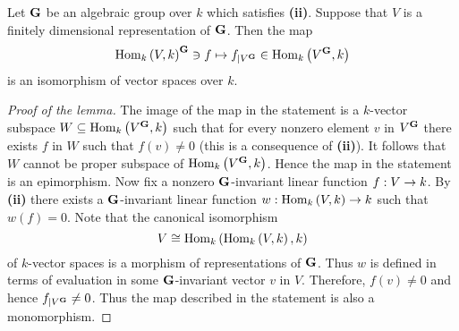 \begin{lemma}\label{lemma:every_functional_comes_from_an_invariant_form}
Let $\mathbf{G}$ be an algebraic group over $k$ which satisfies \textbf{(ii)}. Suppose that $V$ is a finitely dimensional representation of $\mathbf{G}$. Then the map
$$\mathrm{Hom}_{k}\left(V,k\right)^{\mathbf{G}}\ni f \mapsto f_{\mid V^{\mathbf{G}}}\in \mathrm{Hom}_k\left(V^{\mathbf{G}}, k\right)$$
is an isomorphism of vector spaces over $k$.
\end{lemma}
\begin{proof}[Proof of the lemma]
The image of the map in the statement is a $k$-vector subspace $W\subseteq \mathrm{Hom}_k\left(V^{\mathbf{G}}, k\right)$ such that for every nonzero element $v$ in $V^{\mathbf{G}}$ there exists $f$ in $W$ such that $f(v)\neq 0$ (this is a consequence of \textbf{(ii)}). It follows that $W$ cannot be proper subspace of $\mathrm{Hom}_k\left(V^{\mathbf{G}}, k\right)$. Hence the map in the statement is an epimorphism. Now fix a nonzero $\mathbf{G}$-invariant linear function $f:V\rightarrow k$. By \textbf{(ii)} there exists a $\mathbf{G}$-invariant linear function $w:\mathrm{Hom}_k\left(V,k\right)\rightarrow k$ such that $w(f) = 0$. Note that the canonical isomorphism
$$V \cong\mathrm{Hom}_k\left(\mathrm{Hom}_k\left(V,k\right),k\right)$$
of $k$-vector spaces is a morphism of representations of $\mathbf{G}$. Thus $w$ is defined in terms of evaluation in some $\mathbf{G}$-invariant vector $v$ in $V$. Therefore, $f(v)\neq 0$ and hence $f_{\mid V^{\mathbf{G}}} \neq 0$. Thus the map described in the statement is also a monomorphism.
\end{proof}

